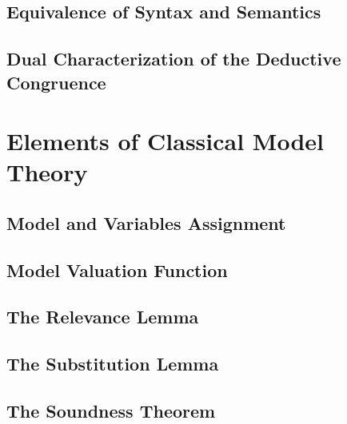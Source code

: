 \documentclass{report}
\begin{document}
    \subsection{Equivalence of Syntax and Semantics}
    \subsection{Dual Characterization of the Deductive Congruence}
\section{Elements of Classical Model Theory}
    \subsection{Model and Variables Assignment}
    \subsection{Model Valuation Function}
    \subsection{The Relevance Lemma}
    \subsection{The Substitution Lemma}
    \subsection{The Soundness Theorem}
\end{document}
